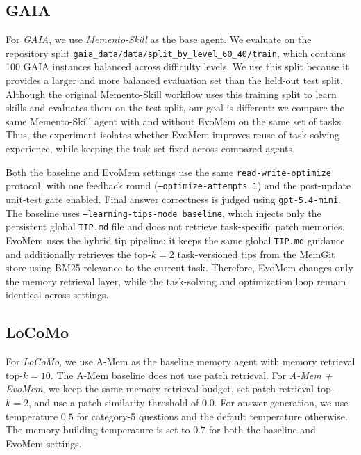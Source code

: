 \documentclass{article}
\begin{document}
\subsection{GAIA}
\label{app:setting_gaia}

For \emph{GAIA}, we use \emph{Memento-Skill} \cite{memento-s} as the base agent. We evaluate on the repository split \texttt{gaia\_data/data/split\_by\_level\_60\_40/train}, which contains 100 GAIA instances balanced across difficulty levels. We use this split because it provides a larger and more balanced evaluation set than the held-out test split. Although the original Memento-Skill workflow uses this training split to learn skills and evaluates them on the test split, our goal is different: we compare the same Memento-Skill agent with and without EvoMem on the same set of tasks. Thus, the experiment isolates whether EvoMem improves reuse of task-solving experience, while keeping the task set fixed across compared agents.

Both the baseline and EvoMem settings use the same \texttt{read-write-optimize} protocol, with one feedback round (\texttt{--optimize-attempts 1}) and the post-update unit-test gate enabled. Final answer correctness is judged using \texttt{gpt-5.4-mini}. The baseline uses \texttt{--learning-tips-mode baseline}, which injects only the persistent global \texttt{TIP.md} file and does not retrieve task-specific patch memories. EvoMem uses the hybrid tip pipeline: it keeps the same global \texttt{TIP.md} guidance and additionally retrieves the top-$k=2$ task-versioned tips from the MemGit store using BM25 relevance to the current task. Therefore, EvoMem changes only the memory retrieval layer, while the task-solving and optimization loop remain identical across settings.

\subsection{LoCoMo}
\label{app:setting_locomo}
For \emph{LoCoMo}, we use A-Mem as the baseline memory agent with memory retrieval top-$k=10$. The A-Mem baseline does not use patch retrieval. For \emph{A-Mem + EvoMem}, we keep the same memory retrieval budget, set patch retrieval top-$k=2$, and use a patch similarity threshold of $0.0$. For answer generation, we use temperature $0.5$ for category-5 questions and the default temperature otherwise. The memory-building temperature is set to $0.7$ for both the baseline and EvoMem settings.
\end{document}
